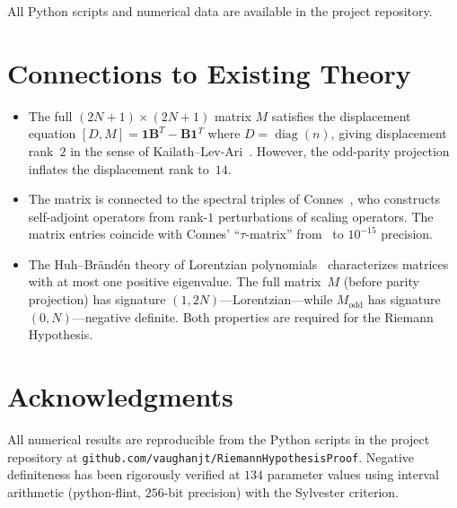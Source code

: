 \documentclass[11pt,a4paper]{article}
\DeclareMathOperator{\diag}{diag}
\begin{document}
All Python scripts and numerical data are available in the project repository.

\section{Connections to Existing Theory}

\begin{itemize}
\item The full $(2N+1) \times (2N+1)$ matrix $M$ satisfies the displacement equation $[D, M] = \mathbf{1}\mathbf{B}^T - \mathbf{B}\mathbf{1}^T$ where $D = \diag(n)$, giving displacement rank~$2$ in the sense of Kailath--Lev-Ari~\cite{Kailath1979}. However, the odd-parity projection inflates the displacement rank to~$14$.

\item The matrix is connected to the spectral triples of Connes~\cite{CC2025}, who constructs self-adjoint operators from rank-$1$ perturbations of scaling operators. The matrix entries coincide with Connes' ``$\tau$-matrix'' from~\cite{CC2025} to $10^{-15}$ precision.

\item The Huh--Br\"and\'en theory of Lorentzian polynomials~\cite{BH2020} characterizes matrices with at most one positive eigenvalue. The full matrix~$M$ (before parity projection) has signature $(1, 2N)$---Lorentzian---while $M_{\mathrm{odd}}$ has signature $(0, N)$---negative definite. Both properties are required for the Riemann Hypothesis.
\end{itemize}

\section*{Acknowledgments}

All numerical results are reproducible from the Python scripts in the project repository at \texttt{github.com/vaughanjt/RiemannHypothesisProof}. Negative definiteness has been rigorously verified at $134$ parameter values using interval arithmetic (python-flint, $256$-bit precision) with the Sylvester criterion.
\end{document}
